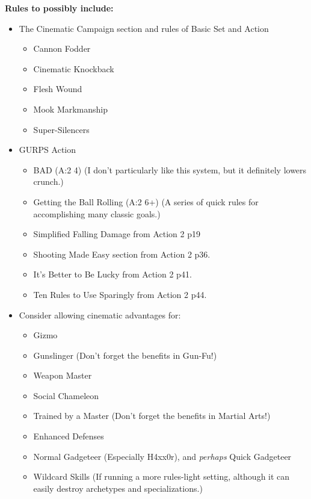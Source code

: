 \begin{multicols}{2}
	\textbf{Rules to possibly include:}
	\begin{itemize}
		\itemsep 0pt
		\item The Cinematic Campaign section and rules of Basic Set and Action
		\begin{itemize}
			\itemsep 0pt
			\item Cannon Fodder
			\item Cinematic Knockback
			\item Flesh Wound
			\item Mook Markmanship
			\item Super-Silencers
		\end{itemize}
		\item GURPS Action
		\begin{itemize}
			\itemsep 0pt
			\item BAD (A:2 4) (I don't particularly like this system, but it definitely lowers crunch.)
			\item Getting the Ball Rolling (A:2 6+) (A series of quick rules for accomplishing many classic goals.)
			\item Simplified Falling Damage from Action 2 p19
			\item Shooting Made Easy section from Action 2 p36.
			\item It's Better to Be Lucky from Action 2 p41.
			\item Ten Rules to Use Sparingly from Action 2 p44.
		\end{itemize}
		\item Consider allowing cinematic advantages for:
		\begin{itemize}
			\itemsep 0pt
			\item Gizmo
			\item Gunslinger (Don't forget the benefits in Gun-Fu!)
			\item Weapon Master
			\item Social Chameleon	
			\item Trained by a Master (Don't forget the benefits in Martial Arts!)
			\item Enhanced Defenses
			\item Normal Gadgeteer (Especially H4xx0r), and \textit{perhaps} Quick Gadgeteer
			\item Wildcard Skills (If running a more rules-light setting, although it can easily destroy archetypes and specializations.)
		\end{itemize}
	\end{itemize}
	

\end{multicols}
